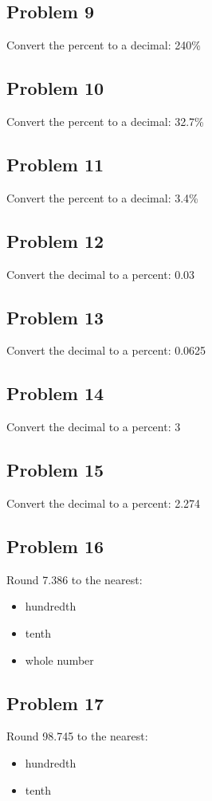 \documentclass[12pt]{article}
\begin{document}
\subsection*{Problem 9}
Convert the percent to a decimal: 240\%

\subsection*{Problem 10}
Convert the percent to a decimal: 32.7\%

\subsection*{Problem 11}
Convert the percent to a decimal: 3.4\%

\subsection*{Problem 12}
Convert the decimal to a percent: 0.03

\subsection*{Problem 13}
Convert the decimal to a percent: 0.0625

\subsection*{Problem 14}
Convert the decimal to a percent: 3

\subsection*{Problem 15}
Convert the decimal to a percent: 2.274

\subsection*{Problem 16}
Round 7.386 to the nearest:
\begin{itemize}
    \item hundredth
    \item tenth
    \item whole number
\end{itemize}

\subsection*{Problem 17}
Round 98.745 to the nearest:
\begin{itemize}
    \item hundredth
    \item tenth
\end{itemize}
\end{document}
